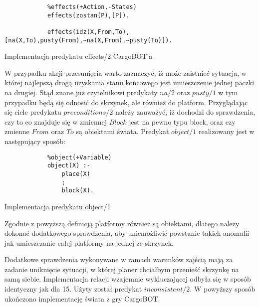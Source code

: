     \begin{listing}[H]
        \begin{verbatim}
            %effects(+Action,-States)
            effects(zostan(P),[P]).

            effects(idz(X,From,To),[na(X,To),pusty(From),~na(X,From),~pusty(To)]).
        \end{verbatim}
    \caption{Implementacja predykatu effects/2 CargoBOT'a}
    \end{listing}
    W przypadku akcji przesunięcia warto zaznaczyć, iż może zaistnieć sytuacja, w której najlepszą drogą uzyskania stanu końcowego jest 
    umieszczenie jednej paczki na drugiej. Stąd znane już czytelnikowi predykaty $na/2$ oraz $pusty/1$ w tym przypadku będą się odnosić do skrzynek, 
    ale również do platform. Przyglądając się ciele predykatu $preconditions/2$ należy zauważyć, iż dochodzi do sprawdzenia, czy 
    to co znajduje się w zmiennej $Block$ jest na pewno typu block, oraz czy zmienne $From$ oraz $To$ są obiektami świata. 
    Predykat $object/1$ realizowany jest w następujący sposób:

    \begin{listing}[H]
        \begin{verbatim}
            %object(+Variable)
            object(X) :-
                place(X)
                ;
                block(X).
        \end{verbatim}
    \caption{Implementacja predykatu object/1}
    \end{listing}

    Zgodnie z powyższą definicją platformy również są obiektami, dlatego należy dokonać dodatkowego sprawdzenia, aby uniemożliwić powstanie 
    takich anomalii jak umieszczanie całej platformy na jednej ze skrzynek.

    Dodatkowe sprawdzenia wykonywane w ramach warunków zajścią mają za zadanie uniknięcie sytuacji, w której planer chciałbym przenieść skrzynkę 
    na samą siebie.
    Implementacja relacji wzajemnie wykluczającej odbyła się w sposób identyczny jak dla 15. Użyty został predykat $inconsistent/2$.
    W powyższy sposób ukończono implementację świata z gry CargoBOT.

